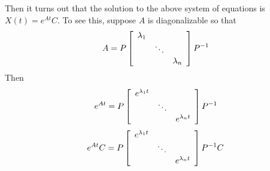 Then it turns out that the solution to the
above system of equations is $X\left( t\right) =e^{At}C$. To see this, suppose $A$ is
diagonalizable so that 
\begin{equation*}
A=P\left[ 
\begin{array}{ccc}
\lambda _{1} &  &  \\ 
& \ddots &  \\ 
&  & \lambda _{n}
\end{array}
\right] P^{-1}
\end{equation*}
Then 
\begin{equation*}
e^{At}=P\left[ 
\begin{array}{ccc}
e^{\lambda _{1}t} &  &  \\ 
& \ddots &  \\ 
&  & e^{\lambda _{n}t}
\end{array}
\right] P^{-1}
\end{equation*} 
\begin{equation*}
e^{At}C=P\left[ 
\begin{array}{ccc}
e^{\lambda _{1}t} &  &  \\ 
& \ddots &  \\ 
&  & e^{\lambda _{n}t}
\end{array}
\right] P^{-1}C
\end{equation*}


